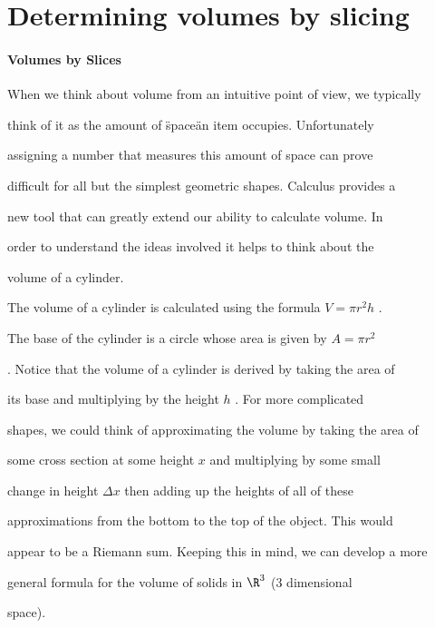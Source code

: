 \section{Determining volumes by slicing}
\label{sec:determining-volumes-by-slicing}

\paragraph{Volumes by Slices}



When we think about volume from an intuitive point of view, we typically

think of it as the amount of \"space\" an item occupies. Unfortunately

assigning a number that measures this amount of space can prove

difficult for all but the simplest geometric shapes. Calculus provides a

new tool that can greatly extend our ability to calculate volume. In

order to understand the ideas involved it helps to think about the

volume of a cylinder.



The volume of a cylinder is calculated using the formula $V=\pi r^2h$ .

The base of the cylinder is a circle whose area is given by $A=\pi r^2$

. Notice that the volume of a cylinder is derived by taking the area of

its base and multiplying by the height $h$ . For more complicated

shapes, we could think of approximating the volume by taking the area of

some cross section at some height $x$ and multiplying by some small

change in height $\Delta x$ then adding up the heights of all of these

approximations from the bottom to the top of the object. This would

appear to be a Riemann sum. Keeping this in mind, we can develop a more

general formula for the volume of solids in $\R^3$ (3 dimensional

space).



